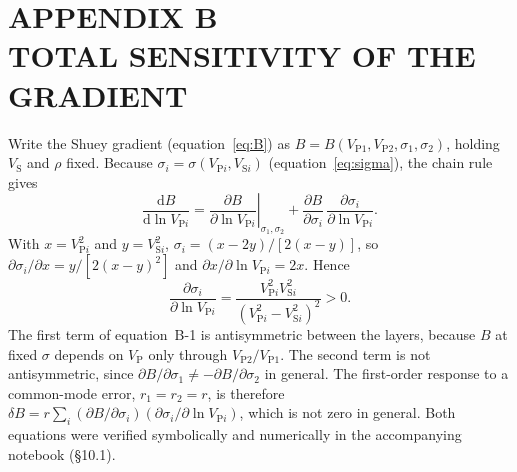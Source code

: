 \documentclass[11pt]{article}
\newcommand{\VP}{V_\mathrm{P}}
\newcommand{\VS}{V_\mathrm{S}}
\begin{document}
\section*{APPENDIX B\\ TOTAL SENSITIVITY OF THE GRADIENT}
\setcounter{equation}{0}
\renewcommand{\theequation}{B-\arabic{equation}}

Write the Shuey gradient (equation~\ref{eq:B}) as $B=B(V_{\mathrm{P}1},V_{\mathrm{P}2},\sigma_1,\sigma_2)$, holding $\VS$ and $\rho$ fixed. Because $\sigma_i=\sigma(V_{\mathrm{P}i},V_{\mathrm{S}i})$ (equation~\ref{eq:sigma}), the chain rule gives
\begin{equation}
\frac{\mathrm{d}B}{\mathrm{d}\ln V_{\mathrm{P}i}}=\left.\frac{\partial B}{\partial\ln V_{\mathrm{P}i}}\right|_{\sigma_1,\sigma_2}+\frac{\partial B}{\partial\sigma_i}\,\frac{\partial\sigma_i}{\partial\ln V_{\mathrm{P}i}}.
\end{equation}
With $x=V_{\mathrm{P}i}^2$ and $y=V_{\mathrm{S}i}^2$, $\sigma_i=(x-2y)/[2(x-y)]$, so $\partial\sigma_i/\partial x=y/[2(x-y)^2]$ and $\partial x/\partial\ln V_{\mathrm{P}i}=2x$. Hence
\begin{equation}
\frac{\partial\sigma_i}{\partial\ln V_{\mathrm{P}i}}=\frac{V_{\mathrm{P}i}^2V_{\mathrm{S}i}^2}{\left(V_{\mathrm{P}i}^2-V_{\mathrm{S}i}^2\right)^2}>0.
\end{equation}
The first term of equation~B-1 is antisymmetric between the layers, because $B$ at fixed $\sigma$ depends on $\VP$ only through $V_{\mathrm{P}2}/V_{\mathrm{P}1}$. The second term is not antisymmetric, since $\partial B/\partial\sigma_1\neq-\partial B/\partial\sigma_2$ in general. The first-order response to a common-mode error, $r_1=r_2=r$, is therefore $\delta B=r\sum_i(\partial B/\partial\sigma_i)(\partial\sigma_i/\partial\ln V_{\mathrm{P}i})$, which is not zero in general. Both equations were verified symbolically and numerically in the accompanying notebook (\S10.1).
\end{document}
